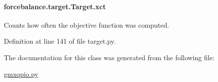 \hypertarget{classforcebalance_1_1target_1_1Target_aad2e385cfbf7b4a68f1c2cb41133fe82}{
\paragraph[{xct}]{\setlength{\rightskip}{0pt plus 5cm}forcebalance.\-target.\-Target.\-xct\hspace{0.3cm}{\ttfamily [inherited]}}}\label{classforcebalance_1_1target_1_1Target_aad2e385cfbf7b4a68f1c2cb41133fe82}


Counts how often the objective function was computed. 



Definition at line 141 of file target.\-py.



The documentation for this class was generated from the following file\-:\begin{DoxyCompactItemize}
\item 
\hyperlink{gmxqpio_8py}{gmxqpio.\-py}\end{DoxyCompactItemize}
